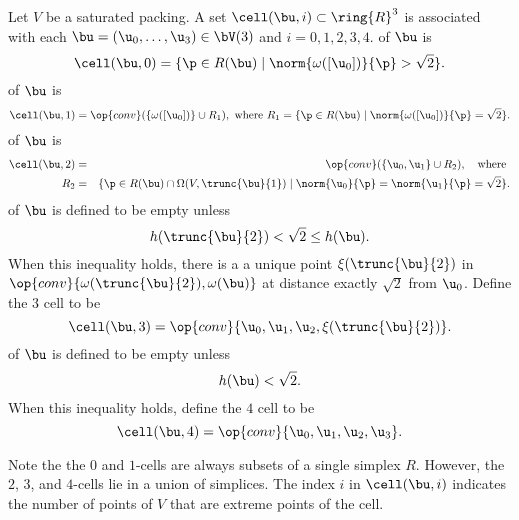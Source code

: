 \begin{definition} 
Let $V$ be a saturated packing.  
A set $\cell(\bu,i)\subset\ring{R}^3$ is associated with each $\bu=( \u_0,\ldots,
\u_3)\in \bV(3)$ and $i=0,1,2,3,4$.  
\hfill\break\smallskip {} of $\bu$
is
\begin{displaymath}
\cell(\bu,0) = \{\p\in R(\bu) \mid \norm{\omega([ \u_0])}{\p} > \sqrt2\}.
\end{displaymath}
\bigskip
{} of $\bu$ is 
\begin{displaymath}
\cell(\bu,1) = \op{conv}(\{\omega([ \u_0])\}\cup R_1),\hbox{ where } R_1 = \{\p \in R(\bu) \mid \norm{\omega([ \u_0])}{\p}= \sqrt2\}.
\end{displaymath}
%
%
%
\bigskip
{} of $\bu$ is
\begin{eqnarray*}
\cell(\bu,2) &=& \op{conv}( \{\u_0, \u_1\}\cup R_2),\quad\text{where }  \vspace{6pt}\\
R_2 &=& \{\p \in R(\bu)\cap \Omega(V,\trunc{\bu}{1}) \mid \norm{ \u_0}{\p}=\norm{ \u_1}{\p} =\sqrt2\}.
\end{eqnarray*}
\bigskip
{} of $\bu$ is defined to be empty unless 
\begin{displaymath}
h(\trunc{\bu}{2}) <\sqrt2 \le h(\bu).
\end{displaymath}
When this inequality holds, there is a a unique point $\xi(\trunc{\bu}{2})$ in
$\op{conv}\{\omega(\trunc{\bu}{2}),\omega(\bu)\}$ at distance exactly
$\sqrt2$ from $ \u_0$.  Define the $3$ cell to be
\begin{displaymath}
\cell(\bu,3) = \op{conv}\{ \u_0, \u_1, \u_2,\xi(\trunc{\bu}{2})\}.
\end{displaymath}
\bigskip
{} of $\bu$ is defined to be empty unless
\begin{displaymath}
h(\bu) <\sqrt2.
\end{displaymath}
When this inequality holds, define the $4$ cell to be
\begin{displaymath}
\cell(\bu,4) = \op{conv}\{ \u_0, \u_1, \u_2, \u_3\}.
\end{displaymath}
\end{definition}
%

Note the the $0$ and $1$-cells are always subsets of a single simplex
$R$.  However, the $2$, $3$, and $4$-cells lie in a union of
simplices.  The index $i$ in  $\cell(\bu,i)$ indicates the number
of points of $V$ that are extreme points of the cell. 


